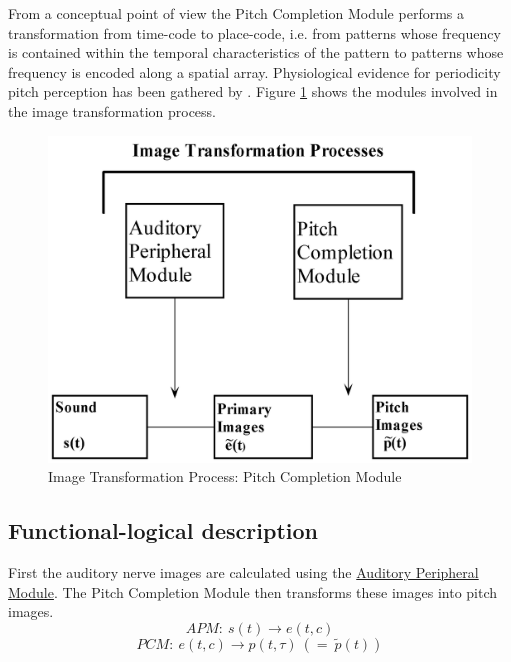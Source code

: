 From a conceptual point of view the Pitch Completion Module
performs a transformation from time-code to place-code, i.e. from
patterns whose frequency is contained within the temporal
characteristics of the pattern to patterns whose frequency is
encoded along a spatial array. Physiological evidence for
periodicity pitch perception has been gathered by
. Figure \ref{Fig:PCMModule} shows the
modules involved in the image transformation process.
\begin{figure}[h]
    \centering
    \includegraphics[width=\IPEMDefaultFigureWidth]{Graphics/PCMModule}
    \caption{Image Transformation Process: Pitch Completion Module}
    \label{Fig:PCMModule}
\end{figure}

\subsection{Functional-logical description}

First the auditory nerve images are calculated using the
\hyperlink{Concepts:AuditoryPeripheralModule}{Auditory Peripheral
Module}. The Pitch Completion Module then transforms these images
into pitch images.
\[APM:~ s(t) \rightarrow e(t,c)\]
\[PCM:~ e(t,c) \rightarrow p(t,\tau)~(=~\tilde{p}(t))\]

